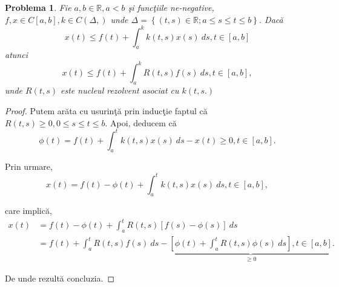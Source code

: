 \documentclass[a4paper,12pt,oneside]{report}
\newtheorem{problem}{Problema}
\begin{document}
 	      			      			      			      	
\begin{problem}
Fie \(a,b \in \mathbb{R}, a< b\) \c{s}i func\c{t}iile ne-negative, \(f,x \in C\left [ a,b \right ], k\in C\left ( \Delta,  \right )\) unde \(\Delta  = \left \{ \left ( t,s \right ) \in \mathbb{R}; a\leq s\leq t\leq b\right \}\). Dac\u{a}
\begin{displaymath}
  x\left ( t \right ) \leq f\left ( t \right ) + \int_{a}^{k}k\left ( t,s \right )x\left ( s \right )\ ds , t\in \left [ a,b \right ]
\end{displaymath}
atunci
\begin{displaymath}
  x\left ( t \right ) \leq f\left ( t \right ) + \int_{a}^{k}R\left ( t,s \right )f\left ( s \right )\ ds , t\in \left [ a,b \right ],
\end{displaymath}
 unde \(R\left ( t,s \right )\) este nucleul rezolvent asociat cu \(k\left ( t,s. \right )\)
\end{problem}
\begin{proof}
  	      			      			      			      	
Putem ar\u{a}ta cu usurin\c{t}\u{a} prin induc\c{t}ie faptul c\u{a} \(R\left ( t,s \right ) \geq 0, 0\leq s\leq t\leq b.\)
Apoi, deducem c\u{a}
\begin{displaymath}
  \phi \left ( t \right ) = f\left ( t \right ) + \int_{a}^{t} k\left ( t,s \right ) x\left ( s \right ) \ ds - x\left ( t \right ) \geq 0, t \in \left [ a,b \right ].
\end{displaymath}
  	      			      			      			      	
\noindent Prin urmare,
\begin{displaymath}
  x\left ( t \right ) = f\left ( t \right ) - \phi \left ( t \right ) + \int_{a}^{t} k\left ( t,s \right )x\left ( s \right ) \ ds, t \in \left [ a,b \right ],
\end{displaymath}
  	      			      			      			      	
\noindent care implic\u{a},
\begin{equation} \nonumber
    \begin{split}
         x\left ( t \right ) &  = f\left ( t \right ) - \phi \left ( t \right ) + \int_{a}^{t} R\left ( t,s \right ) \left [ f\left ( s \right ) - \phi \left ( s \right ) \right ]\ ds \\ &
         = f\left ( t \right ) + \int_{a}^{t} R\left ( t,s \right )f\left ( s \right ) \ ds - \underbrace{ \left [ \phi \left ( t \right ) + \int_{a}^{t}R\left ( t,s \right )\phi \left ( s \right ) \ ds \right ], t \in \left [ a,b \right ]}_{\geq 0}.
    \end{split}
\end{equation}


De unde rezult\u{a} concluzia.
\end{proof}
  	      			      			      			      		
\end{document}
